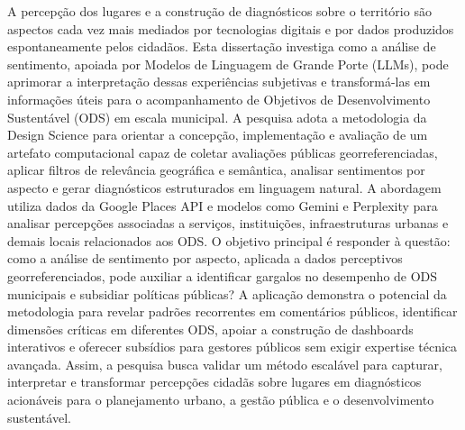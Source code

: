 A percepção dos lugares e a construção de diagnósticos sobre o território são aspectos cada vez mais mediados por tecnologias digitais e por dados produzidos espontaneamente pelos cidadãos. Esta dissertação investiga como a análise de sentimento, apoiada por Modelos de Linguagem de Grande Porte (LLMs), pode aprimorar a interpretação dessas experiências subjetivas e transformá-las em informações úteis para o acompanhamento de Objetivos de Desenvolvimento Sustentável (ODS) em escala municipal. A pesquisa adota a metodologia da Design Science para orientar a concepção, implementação e avaliação de um artefato computacional capaz de coletar avaliações públicas georreferenciadas, aplicar filtros de relevância geográfica e semântica, analisar sentimentos por aspecto e gerar diagnósticos estruturados em linguagem natural. A abordagem utiliza dados da Google Places API e modelos como Gemini e Perplexity para analisar percepções associadas a serviços, instituições, infraestruturas urbanas e demais locais relacionados aos ODS. O objetivo principal é responder à questão: como a análise de sentimento por aspecto, aplicada a dados perceptivos georreferenciados, pode auxiliar a identificar gargalos no desempenho de ODS municipais e subsidiar políticas públicas? A aplicação demonstra o potencial da metodologia para revelar padrões recorrentes em comentários públicos, identificar dimensões críticas em diferentes ODS, apoiar a construção de dashboards interativos e oferecer subsídios para gestores públicos sem exigir expertise técnica avançada. Assim, a pesquisa busca validar um método escalável para capturar, interpretar e transformar percepções cidadãs sobre lugares em diagnósticos acionáveis para o planejamento urbano, a gestão pública e o desenvolvimento sustentável.

